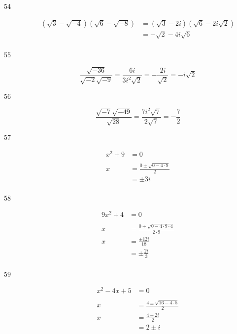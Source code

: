 \documentclass{exam}
\begin{document}
\begin{description}
    \item[54] 
      \begin{align*}
        \left( \sqrt{3} - \sqrt{-4} \right)\left( \sqrt{6} - \sqrt{-8} \right) 
           &= \left( \sqrt{3} - 2i \right)\left( \sqrt{6} - 2i \sqrt{2} \right) \\
           &= \boxed{-\sqrt{2}-4 i \sqrt{6}} \\
      \end{align*}

    \item[55] 
      \[
        \frac{\sqrt{-36}}{\sqrt{-2}\sqrt{-9}} = \frac{6i}{3i^2 \sqrt{2}} = - \frac{2i}{\sqrt{2}} = \boxed{- i \sqrt{2}}
      \]

    \item[56] 
      \[
        \frac{\sqrt{-7} \sqrt{-49}}{\sqrt{28}} = \frac{7i^2 \sqrt{7}}{2 \sqrt{7}} = \boxed{- \frac{7}{2}}
      \]

    \item[57] 
      \begin{align*}
        x^2 + 9 &= 0 \\
        \\
        x &= \frac{0 \pm \sqrt{0 - 4 \cdot 9}}{2} \\
          &= \boxed{\pm 3i} \\
      \end{align*}

    \item[58] 
      \begin{align*}
        9x^2 + 4 &= 0 \\
        \\
        x &= \frac{0 \pm \sqrt{0 - 4 \cdot 9 \cdot 4}}{2 \cdot 9} \\
        x &= \frac{\pm 12i}{18} \\
          &= \boxed{\pm \frac{2i}{3}} \\
      \end{align*}

    \item[59] 
      \begin{align*}
        x^2 - 4x + 5 &= 0 \\
        \\
        x &= \frac{4 \pm \sqrt{16 - 4 \cdot 5}}{2} \\
        x &= \frac{4 \pm 2i }{2} \\
          &= \boxed{2 \pm i} \\
      \end{align*}


\end{description}
\end{document}
